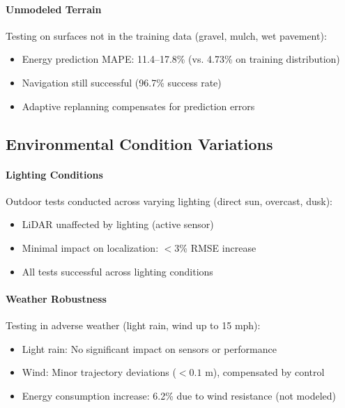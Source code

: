 
\paragraph{Unmodeled Terrain}
Testing on surfaces not in the training data (gravel, mulch, wet pavement):

\begin{itemize}
    \item Energy prediction MAPE: 11.4--17.8\% (vs. 4.73\% on training distribution)
    \item Navigation still successful (96.7\% success rate)
    \item Adaptive replanning compensates for prediction errors
\end{itemize}

\subsection{Environmental Condition Variations}

\paragraph{Lighting Conditions}
Outdoor tests conducted across varying lighting (direct sun, overcast, dusk):
\begin{itemize}
    \item LiDAR unaffected by lighting (active sensor)
    \item Minimal impact on localization: $< 3$\% RMSE increase
    \item All tests successful across lighting conditions
\end{itemize}

\paragraph{Weather Robustness}
Testing in adverse weather (light rain, wind up to 15 mph):
\begin{itemize}
    \item Light rain: No significant impact on sensors or performance
    \item Wind: Minor trajectory deviations ($< 0.1$ m), compensated by control
    \item Energy consumption increase: 6.2\% due to wind resistance (not modeled)
\end{itemize}

